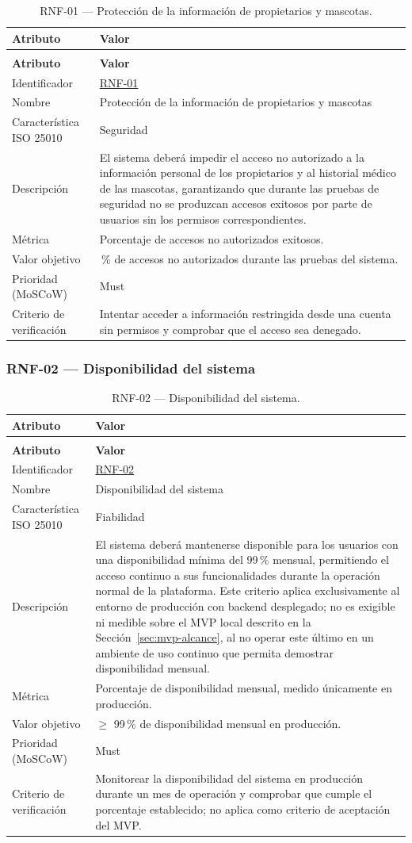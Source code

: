 \documentclass[journal,onecolumn]{IEEEtran}
\makeatletter
\newenvironment{atributos}[2]{%
	\small
	\begin{longtable}{@{}>{\raggedright\arraybackslash}p{4.2cm} >{\raggedright\arraybackslash}p{11.2cm}@{}}
		\caption{#2}\label{tab:#1}\\
		\toprule
		\textbf{Atributo} & \textbf{Valor} \\
		\midrule
		\endfirsthead
		\multicolumn{2}{@{}l}{\small\itshape (continuación)}\\
		\toprule
		\textbf{Atributo} & \textbf{Valor} \\
		\midrule
		\endhead
		\bottomrule
		\endlastfoot
	}{%
	\end{longtable}
	\normalsize
}
\makeatother
\begin{document}
	\begin{atributos}{RNF-01}{RNF-01 --- Protección de la información de propietarios y mascotas.}
		Identificador & \hyperref[tab:RNF-01]{RNF-01} \\
		Nombre & Protección de la información de propietarios y mascotas \\
		Característica ISO 25010 & Seguridad \\
		Descripción & El sistema deberá impedir el acceso no autorizado a la información personal de los propietarios y al historial médico de las mascotas, garantizando que durante las pruebas de seguridad no se produzcan accesos exitosos por parte de usuarios sin los permisos correspondientes. \\
		Métrica & Porcentaje de accesos no autorizados exitosos. \\
		Valor objetivo & 0\,\% de accesos no autorizados durante las pruebas del sistema. \\
		Prioridad (MoSCoW) & Must \\
		Criterio de verificación & Intentar acceder a información restringida desde una cuenta sin permisos y comprobar que el acceso sea denegado. \\
	\end{atributos}
	
	\subsubsection{RNF-02 --- Disponibilidad del sistema}
	
	\begin{atributos}{RNF-02}{RNF-02 --- Disponibilidad del sistema.}
		Identificador & \hyperref[tab:RNF-02]{RNF-02} \\
		Nombre & Disponibilidad del sistema \\
		Característica ISO 25010 & Fiabilidad \\
		Descripción & El sistema deberá mantenerse disponible para los usuarios con una disponibilidad mínima del 99\,\% mensual, permitiendo el acceso continuo a sus funcionalidades durante la operación normal de la plataforma. Este criterio aplica exclusivamente al entorno de producción con backend desplegado; no es exigible ni medible sobre el MVP local descrito en la Sección~\ref{sec:mvp-alcance}, al no operar este último en un ambiente de uso continuo que permita demostrar disponibilidad mensual. \\
		Métrica & Porcentaje de disponibilidad mensual, medido únicamente en producción. \\
		Valor objetivo & $\geq$ 99\,\% de disponibilidad mensual en producción. \\
		Prioridad (MoSCoW) & Must \\
		Criterio de verificación & Monitorear la disponibilidad del sistema en producción durante un mes de operación y comprobar que cumple el porcentaje establecido; no aplica como criterio de aceptación del MVP. \\
	\end{atributos}
	
\end{document}
